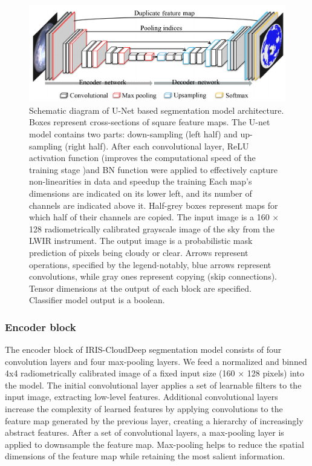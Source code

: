 \documentclass[amt, article]{copernicus}
\begin{document}
\begin{figure}[t]
	\includegraphics[width=\hsize]{figures/schematics_segmentation_model.png}
	\caption{
		Schematic diagram of U-Net based segmentation model architecture. Boxes represent cross-sections of square feature maps. The U-net model contains two parts: down-sampling (left half) and up-sampling (right half). After each convolutional layer, ReLU activation function (improves the computational speed of the training stage )and BN function were applied to effectively capture non-linearities in data and speedup the training
        Each map's dimensions are indicated on its lower left, and its number of channels are indicated above it. Half-grey boxes represent maps for which half of their channels are copied. The input image is a 160 × 128 radiometrically calibrated grayscale image of the sky from the LWIR instrument. The output image is a probabilistic mask prediction of pixels being cloudy or clear. Arrows represent operations, specified by the legend-notably, blue arrows represent convolutions, while gray ones represent copying (skip connections). Tensor dimensions at the output of each block are specified. Classifier model output is a boolean.}
    \label{fig:schematics_segmentation_model}
\end{figure}

\subsubsection{Encoder block}

The encoder block of IRIS-CloudDeep segmentation model consists of four convolution layers and four max-pooling layers. We feed a normalized and binned 4x4 radiometrically calibrated image of a fixed input size (160 × 128 pixels) into the model.
The initial convolutional layer applies a set of learnable filters to the input image, extracting low-level features. Additional convolutional layers increase the complexity of learned features by applying convolutions to the feature map generated by the previous layer, creating a hierarchy of increasingly abstract features. After a set of convolutional layers, a max-pooling layer is applied to downsample the feature map. Max-pooling helps to reduce the spatial dimensions of the feature map while retaining the most salient information.
\end{document}
